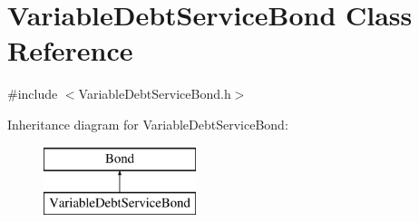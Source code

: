\hypertarget{classVariableDebtServiceBond}{}\section{Variable\+Debt\+Service\+Bond Class Reference}
\label{classVariableDebtServiceBond}


{\ttfamily \#include $<$Variable\+Debt\+Service\+Bond.\+h$>$}

Inheritance diagram for Variable\+Debt\+Service\+Bond\+:\begin{figure}[H]
\begin{center}
\leavevmode
\includegraphics[height=2.000000cm]{classVariableDebtServiceBond}
\end{center}
\end{figure}
